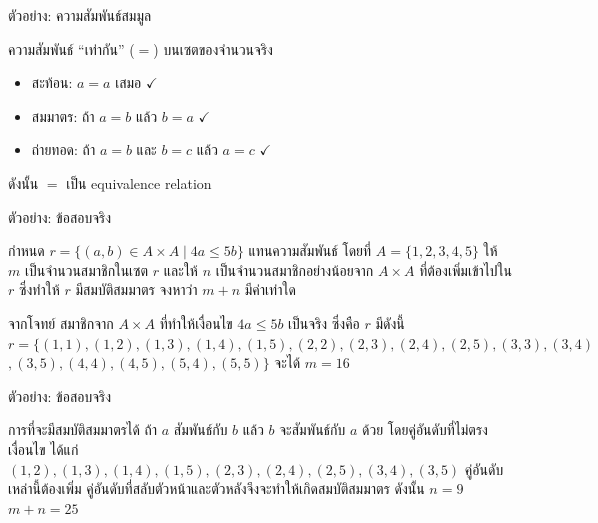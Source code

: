 \documentclass[11pt, aspectratio=169]{beamer}
\begin{document}
\begin{frame}{ตัวอย่าง: ความสัมพันธ์สมมูล}

  \begin{exambox}[ตัวอย่าง]
    ความสัมพันธ์ ``เท่ากัน'' ($=$) บนเซตของจำนวนจริง
    \begin{itemize}
      \item สะท้อน: $a = a$ เสมอ $\checkmark$
      \item สมมาตร: ถ้า $a = b$ แล้ว $b = a$ $\checkmark$
      \item ถ่ายทอด: ถ้า $a = b$ และ $b = c$ แล้ว $a = c$ $\checkmark$
    \end{itemize}
    ดังนั้น $=$ เป็น equivalence relation
  \end{exambox}
\end{frame}

\begin{frame}{ตัวอย่าง: ข้อสอบจริง}
  \begin{exambox}[โจทย์ปี 68 ข้อ 9]
    กำหนด $r=\{(a,b) \in A \times  A \mid 4a \leq 5b\}$ แทนความสัมพันธ์ \newline
    โดยที่ $A=\{1,2,3,4,5\}$ ให้ $m$ เป็นจำนวนสมาชิกในเซต $r$ และให้ $n$ เป็นจำนวนสมาชิกอย่างน้อยจาก $A \times A$ ที่ต้องเพิ่มเข้าไปใน $r$ ซึ่งทำให้ $r$ มีสมบัติสมมาตร จงหาว่า $m+n$ มีค่าเท่าใด
  \end{exambox}

  \begin{solbox}[วิธีทำ]
    จากโจทย์ สมาชิกจาก $A \times A$ ที่ทำให้เงื่อนไข $4a \leq 5b$ เป็นจริง ซึ่งคือ $r$ มีดังนี้ \newline
    $r=\{(1,1),(1,2),(1,3),(1,4),(1,5),(2,2),(2,3),(2,4),(2,5),(3,3),(3,4)$\newline
    $,(3,5),(4,4),(4,5),(5,4),(5,5)\}$ \newline
    จะได้ $m = 16$
  \end{solbox}
\end{frame}

\begin{frame}{ตัวอย่าง: ข้อสอบจริง}
  \begin{solbox}[วิธีทำ (ต่อ)]
    การที่จะมีสมบัติสมมาตรได้ ถ้า $a$ สัมพันธ์กับ $b$ แล้ว $b$ จะสัมพันธ์กับ $a$ ด้วย\newline
    โดยคู่อันดับที่ไม่ตรงเงื่อนไข ได้แก่ $(1,2),(1,3),(1,4),(1,5),(2,3),(2,4),(2,5),(3,4),(3,5)$ \newline
    คู่อันดับเหล่านี้ต้องเพิ่ม คู่อันดับที่สลับตัวหน้าและตัวหลังจึงจะทำให้เกิดสมบัติสมมาตร \newline
    ดังนั้น $n = 9$
    \textbf{$m+n=25$}
  \end{solbox}
\end{frame}
\end{document}
